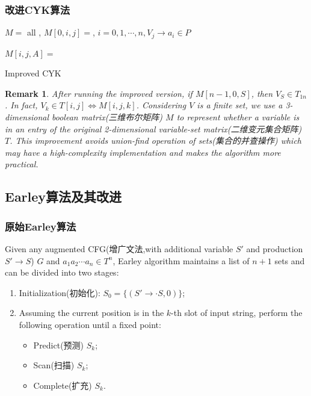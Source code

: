 \documentclass{beamer}
\newtheorem{remark}[theorem]{Remark}
\begin{document}
\begin{frame}
\frametitle{改进CYK算法}
\begin{algorithm}[H]
\begin{algorithmic}[1]

\ENSURE $M=$ all \FALSE, $M[0,i,j]=$\TRUE, $i=0,1,\cdots,n,V_j\to a_i\in P$

					\STATE $M[i,j,A]=$\TRUE
				\ENDIF
			\ENDFOR
		\ENDFOR
	\ENDFOR
\ENDFOR

\end{algorithmic}
\caption{Improved CYK}
\label{alg:improved_cyk}
\end{algorithm}
\end{frame}

\begin{frame}
\begin{remark}
After running the improved version, if $M[n-1,0,S]$, then $V_S\in T_{1n}$. In fact, $V_k\in T[i,j] \iff M[i,j,k]$. Considering $V$ is a finite set, we use a 3-dimensional boolean matrix(三维布尔矩阵) $M$ to represent whether a variable is in an entry of the original 2-dimensional variable-set matrix(二维变元集合矩阵) $T$. This improvement avoids union-find operation of sets(集合的并查操作) which may have a high-complexity implementation and makes the algorithm more practical.
\end{remark}
\end{frame}

\subsection{Earley算法及其改进}
\begin{frame}
\frametitle{原始Earley算法}
Given any augmented CFG(增广文法,with additional variable $S'$ and production $S'\to S$) $G$ and $a_1a_2\cdots a_n\in T^n$, Earley algorithm maintains a list of $n+1$ sets and can be divided into two stages:
\begin{enumerate}
\item Initialization(初始化): $S_0=\{(S'\to\cdot S, 0) \} $;
\item Assuming the current position is in the $k$-th slot of input string, perform the following operation until a fixed point:
\begin{itemize}
\item Predict(预测) $S_k$;
\item Scan(扫描) $S_k$;
\item Complete(扩充) $S_k$.
\end{itemize}
\end{enumerate}
\end{frame}
\end{document}
